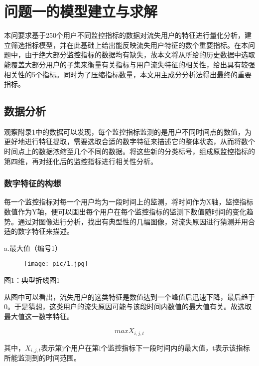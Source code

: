 \documentclass{ctexart}
\begin{document}
    \section{问题一的模型建立与求解}

    本问要求基于250个用户不同监控指标的数据对流失用户的特征进行量化分析，建立筛选指标模型，并在此基础上给出能反映流失用户特征的数个重要指标。在本问题中，由于绝大部分监控指标的数据均有缺失，故本文将从所给的历史数据中选取能覆盖大部分用户的子集来衡量有关指标与用户流失特征的相关性，给出具有较强相关性的5个指标。同时为了压缩指标数量，本文用主成分分析法得出最终的重要指标。

    \subsection{数据分析}

    观察附录1中的数据可以发现，每个监控指标监测的是用户不同时间点的数值，为更好地进行特征提取，需要选取合适的数字特征来描述它的整体状态，从而将数个时间点上的数据浓缩至几个不同的数据。将这些新的分类标号，组成原监控指标的第四维，再对细化后的监控指标进行相关性分析。


    \subsubsection{数字特征的构想}

    每一个监控指标对每一个用户均为一段时间上的监测，将时间作为X轴，监控指标数值作为Y轴，便可以画出每个用户在每个监控指标的监测下数值随时间的变化趋势。通过对图像进行分析，找出有典型性的几幅图像，对流失原因进行猜测并用合适的数字特征来描述。

    a.最大值（编号1）

    \begin{center}
        \begin{figure}[H]
            \begin{center}
                \texttt{[image: pic/1.jpg]}
            \end{center}
        \end{figure}
        图1：典型折线图1
    \end{center}

    从图中可以看出，流失用户的这类特征是数值达到一个峰值后迅速下降，最后趋于0。于是猜想，这类用户的流失原因可能与该段时间内数值的最大值有关。故选取最大值这一数字特征。

    \[
        max{X_{i,j,t}}
    \]

    其中，$X_{i,j,t}$表示第j个用户在第i个监控指标下一段时间内的最大值，t表示该指标所能监测到的时间范围。
\end{document}
